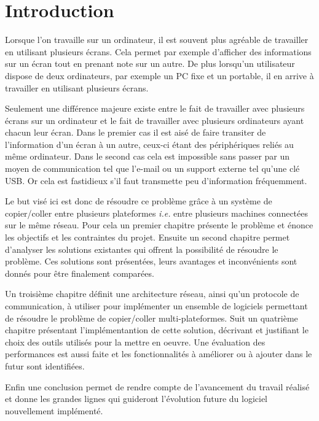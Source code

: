 \chapter*{Introduction}
\renewcommand{\leftmark}{INTRODUCTION}

Lorsque l'on travaille sur un ordinateur, il est souvent plus agréable
de travailler en utilisant plusieurs écrans. Cela permet par exemple
d'afficher des informations sur un écran tout en prenant note sur un autre.
De plus lorsqu'un utilisateur dispose de deux ordinateurs, par exemple
un PC fixe et un portable, il en arrive à travailler en utilisant plusieurs
écrans.

Seulement une différence majeure existe entre le fait de travailler
avec plusieurs écrans sur un ordinateur et le fait de travailler avec
plusieurs ordinateurs ayant chacun leur écran. Dans le premier cas il est
aisé de faire transiter de l'information d'un écran à un autre, ceux-ci
étant des périphériques reliés au même ordinateur. Dans le second cas
cela est impossible sans passer par un moyen de communication tel que l'e-mail
ou un support externe tel qu'une clé USB. Or cela est fastidieux
s'il faut transmette peu d'information fréquemment.

Le but visé ici est donc de résoudre ce problème grâce
à un système de copier/coller entre plusieurs plateformes \emph{i.e.} entre
plusieurs machines connectées sur le même réseau.
Pour cela un premier chapitre présente le problème et énonce
les objectifs et les contraintes du projet. Ensuite un second chapitre
permet d'analyser les solutions existantes qui offrent la possibilité de
résoudre le problème. Ces solutions sont présentées, leurs avantages et
inconvénients sont donnés pour être finalement comparées.

Un troisième chapitre
définit une architecture réseau, ainsi qu'un protocole de
communication, à utiliser pour implémenter un ensemble de logiciels
permettant de résoudre le problème de copier/coller multi-plateformes.
Suit un quatrième chapitre présentant l'implémentantion de cette solution,
décrivant et justifiant le choix des outils utilisés pour la mettre en
oeuvre. Une évaluation des performances est aussi faite et les
fonctionnalités à améliorer ou à ajouter dans le futur sont identifiées.

Enfin une conclusion permet de rendre compte de l'avancement du travail
réalisé et donne les grandes lignes qui guideront l'évolution future
du logiciel nouvellement implémenté.